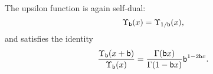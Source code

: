 The upsilon function is again self-dual:
\begin{equation}
    \Upsilon_{\mathsf{b}}(x) = \Upsilon_{1/\mathsf{b}}(x),
\end{equation}
and satisfies the identity
\begin{equation}
    \frac{\Upsilon_{\mathsf{b}}(x+\mathsf{b})}{\Upsilon_{\mathsf{b}}(x)}
        = \frac{\Gamma(\mathsf{b} x)}{\Gamma(1-\mathsf{b} x)} \mathsf{b}^{1-2\mathsf{b} x}.
\label{eq:upsilon_identity}
\end{equation}
















